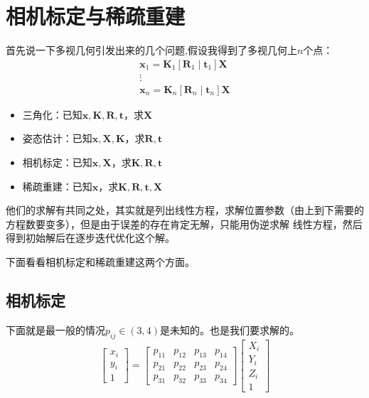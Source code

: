 \documentclass[12pt]{article}
\begin{document}
\section{相机标定与稀疏重建}
首先说一下多视几何引发出来的几个问题,假设我得到了多视几何上$n$个点：
\begin{equation}
    \nonumber
    \begin{array}{l}
        \mathbf{x}_{1}=\mathbf{K}_{1}\left[\mathbf{R}_{1} \mid \mathbf{t}_{1}\right] \mathbf{X} \\
        \vdots \\
        \mathbf{x}_{n}=\mathbf{K}_{n}\left[\mathbf{R}_{n} \mid \mathbf{t}_{n}\right] \mathbf{X}
        \end{array}
\end{equation}
\begin{itemize}
    \item 三角化：已知$\mathbf{x,K,R,t}$，求$\mathbf{X}$
    \item 姿态估计：已知$\mathbf{x,X,K}$，求$\mathbf{R,t}$
    \item 相机标定：已知$\mathbf{x,X}$，求$\mathbf{K,R,t}$
    \item 稀疏重建：已知$\mathbf{x}$，求$\mathbf{K,R,t,X}$
\end{itemize}

他们的求解有共同之处，其实就是列出线性方程，求解位置参数（由上到下需要的方程数要变多），但是由于误差的存在肯定无解，只能用伪逆求解
线性方程，然后得到初始解后在逐步迭代优化这个解。

下面看看相机标定和稀疏重建这两个方面。

\subsection{相机标定}
下面就是最一般的情况$p_{ij}\in(3,4)$是未知的。也是我们要求解的。
\begin{equation}
    \nonumber
    \left[\begin{array}{l}
        x_{i} \\
        y_{i} \\
        1
        \end{array}\right]=\left[\begin{array}{llll}
        p_{11} & p_{12} & p_{13} & p_{14} \\
        p_{21} & p_{22} & p_{23} & p_{24} \\
        p_{31} & p_{32} & p_{33} & p_{34}
        \end{array}\right]\left[\begin{array}{l}
        X_{i} \\
        Y_{i} \\
        Z_{i} \\
        1
        \end{array}\right]
\end{equation}
\end{document}
